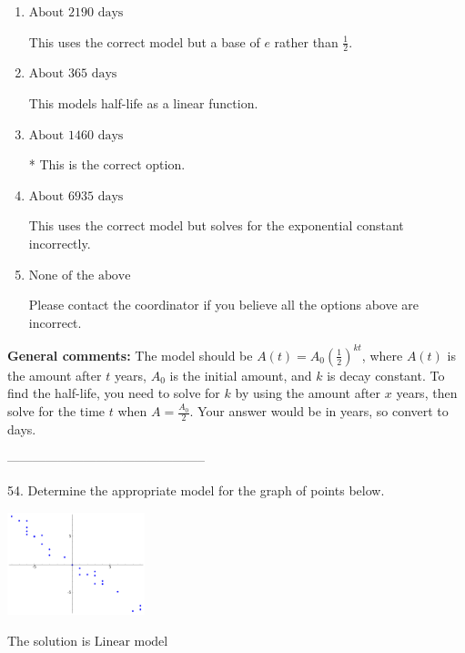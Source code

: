 \documentclass{extbook}[14pt]
\begin{document}
\begin{enumerate}[label=\Alph*.] 
\item $ \text{About } 2190 \text{ days} $ 

 This uses the correct model but a base of $e$ rather than $\frac{1}{2}$. 
\item $ \text{About } 365 \text{ days} $ 

 This models half-life as a linear function. 
\item $ \text{About } 1460 \text{ days} $ 

 * This is the correct option. 
\item $ \text{About } 6935 \text{ days} $ 

 This uses the correct model but solves for the exponential constant incorrectly. 
\item $ \text{None of the above} $ 

 Please contact the coordinator if you believe all the options above are incorrect. 
\end{enumerate} 
 
\textbf{General comments:} The model should be $A(t) = A_0 (\frac{1}{2})^{kt}$, where $A(t)$ is the amount after $t$ years, $A_0$ is the initial amount, and $k$ is decay constant. To find the half-life, you need to solve for $k$ by using the amount after $x$ years, then solve for the time $t$ when $A = \frac{A_0}{2}$. Your answer would be in years, so convert to days.

-----------------------------------------------

54. Determine the appropriate model for the graph of points below.
\begin{center} \includegraphics[width=0.3\textwidth]{../Figures/identifyModelGraph11A.png} \end{center} 

The solution is $ \text{Linear model} $ 
\end{document}
